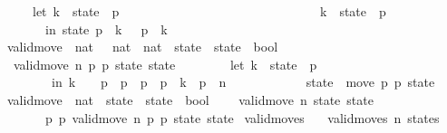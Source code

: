 \begin{isabellebody}
\ \ \ \ \ {\isacharparenleft}let\ k{}\ {\isacharequal}\ state\ {\isacharbang}\ p{}{\isacharsemicolon}\ \ \ \ \ \ \ \ \ \ \ \ \ \ \ \ \ \ \ \ \ \isanewline
\ \ \ \ \ \ \ \ \ \ k{}\ {\isacharequal}\ state\ {\isacharbang}\ p{}\isanewline
\ \ \ \ \ \ \ in\ state\ {\isacharbrackleft}p{}\ {\isacharcolon}{\isacharequal}\ k{}\ {\isacharminus}\ {}{\isacharcomma}\ p{}\ {\isacharcolon}{\isacharequal}\ k{}\ {\isacharplus}\ {}{\isacharbrackright}{\isacharparenright}{\isachardoublequoteclose}\isanewline
\isanewline
{}\isamarkupfalse%
\ valid{\isacharunderscore}move{\isacharprime}\ {\isacharcolon}{\isacharcolon}\ {\isachardoublequoteopen}nat\ \ {\isasymRightarrow}\ nat\ {\isasymRightarrow}\ nat\ {\isasymRightarrow}\ state\ {\isasymRightarrow}\ state\ {\isasymRightarrow}\ bool{\isachardoublequoteclose}\ \ \isanewline
\ \ {\isachardoublequoteopen}valid{\isacharunderscore}move{\isacharprime}\ n\ p{}\ p{}\ state\ state{\isacharprime}\ {\isasymlongleftrightarrow}\ \isanewline
\ \ \ \ \ \ {\isacharparenleft}let\ k{}\ {\isacharequal}\ state\ {\isacharbang}\ p{}\isanewline
\ \ \ \ \ \ \ \ in\ k{}\ {\isachargreater}\ {}\ {\isasymand}\ p{}\ {\isacharless}\ p{}\ {\isasymand}\ p{}\ {\isasymle}\ p{}\ {\isacharplus}\ k{}\ {\isasymand}\ p{}\ {\isasymle}\ n\ {\isasymand}\isanewline
\ \ \ \ \ \ \ \ \ \ \ state{\isacharprime}\ {\isacharequal}\ move\ p{}\ p{}\ state{\isacharparenright}{\isachardoublequoteclose}\isanewline
\isanewline
{}\isamarkupfalse%
\ valid{\isacharunderscore}move\ {\isacharcolon}{\isacharcolon}\ {\isachardoublequoteopen}nat\ {\isasymRightarrow}\ state\ {\isasymRightarrow}\ state\ {\isasymRightarrow}\ bool{\isachardoublequoteclose}\ \ \isanewline
\ \ {\isachardoublequoteopen}valid{\isacharunderscore}move\ n\ state\ state{\isacharprime}\ {\isasymlongleftrightarrow}\ \isanewline
\ \ \ \ \ \ {\isacharparenleft}{\isasymexists}\ p{}\ p{}{\isachardot}\ valid{\isacharunderscore}move{\isacharprime}\ n\ p{}\ p{}\ state\ state{\isacharprime}{\isacharparenright}{\isachardoublequoteclose}\isanewline
\isanewline
{}\isamarkupfalse%
\ valid{\isacharunderscore}moves\ \isanewline
\ \ {\isachardoublequoteopen}valid{\isacharunderscore}moves\ n\ states\ {\isasymlongleftrightarrow}\ \isanewline

\end{isabellebody}
